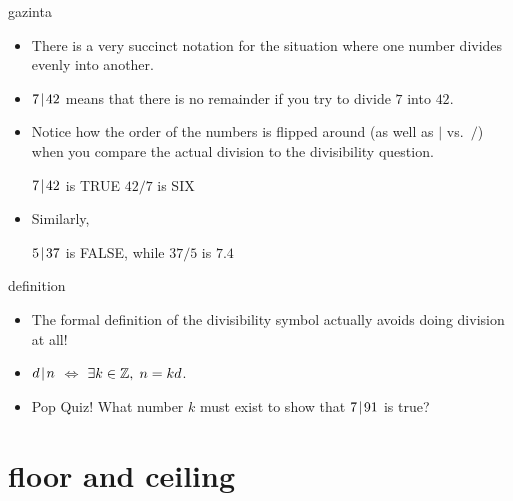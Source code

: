 \documentclass[landscape]{beamer}
\begin{document}
\begin{frame}{gazinta}
\begin{itemize}
\item There is a very succinct notation for the situation where one number divides evenly into another.\pause

\item $7 \!\mid\! 42$ means that there is no remainder if you try to divide $7$ into $42$. \pause
\item Notice how the order of the numbers is flipped around (as well as $\mid$ vs.\ $/$) when you compare the actual division to the divisibility question.\newline

$7\!\mid\! 42$ is TRUE \hspace{.3in} $42/7$ is SIX \pause

\item Similarly, \newline

$5 \!\mid\! 37$ is FALSE, \hspace{.1in}while\hspace{.1in} $37/5$ is $7.4$
 \end{itemize}
\end{frame}

\begin{frame}{definition}
\begin{itemize}
\item The formal definition of the divisibility symbol actually avoids doing division at all! \pause
\item \rule{0pt}{18pt}  $d \!\mid\! n$ \hspace{8pt} $\iff$ \hspace{8pt}  $\exists k \in {\mathbb Z}, \; n = kd$. \pause
\item Pop Quiz!  What number $k$ must exist to show that $7\!\mid\! 91$ is true? 
\end{itemize}
\end{frame}


\section{floor and ceiling}
\end{document}
